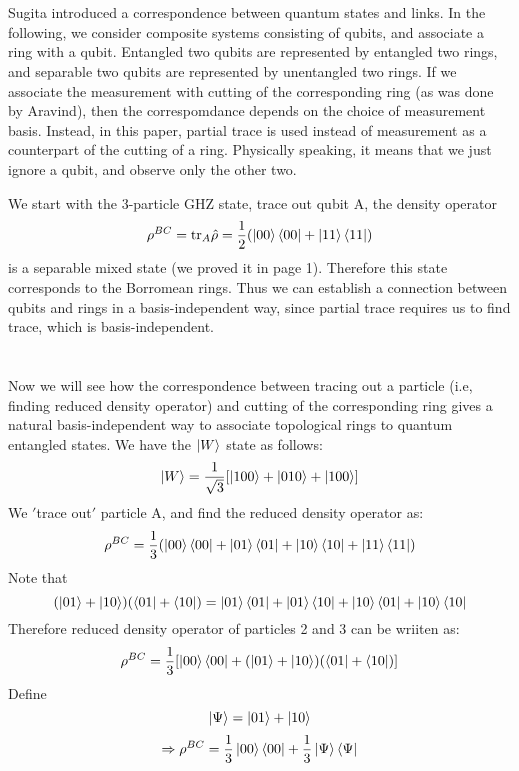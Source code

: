\documentclass{article}
\begin{document}
\section{}
Sugita introduced a correspondence between quantum states and links. In the
 following, we consider composite systems consisting of qubits, and associate a ring
 with a qubit. Entangled two qubits are represented by entangled two rings, and separable two qubits are represented by unentangled two rings.  If we associate the measurement with cutting of the corresponding ring (as was done by Aravind), then the correspomdance  depends on the choice of measurement basis. Instead, in this paper, partial trace is used instead of measurement as a counterpart of the cutting of a ring. Physically speaking, it means that we just ignore a qubit, and observe
 only the other two.

We start with the 3-particle GHZ state, trace out qubit A, the density operator 
\[
\rho^{BC} = \mathrm{tr}_A\hat{\rho} = \frac{1}{2}(\ket{00}\bra{00}+\ket{11}\bra{11})
\]
is a separable mixed state (we proved it in page 1). Therefore this state corresponds to the Borromean rings. Thus we can establish a connection between qubits and rings in a basis-independent way, since partial trace requires us to find trace, which is basis-independent.



\section{}
Now we will see how the correspondence between tracing out a particle (i.e, finding reduced density operator) and cutting of the corresponding ring gives a natural basis-independent way to associate topological rings to quantum entangled states. We have the $\ket{W}$ state as follows:
\[
\ket{W} = \frac{1}{\sqrt{3}}[\ket{100}+\ket{010}+\ket{100}]
\]
We $'$trace out$'$ particle A, and find the reduced density operator as:
\[
\rho^{BC} = \frac{1}{3}(\ket{00}\bra{00}+\ket{01}\bra{01}+\ket{10}\bra{10}+\ket{11}\bra{11})
\]
Note that
\[
(\ket{01}+\ket{10})(\bra{01}+\bra{10}) = \ket{01}\bra{01}+\ket{01}\bra{10}+\ket{10}\bra{01}+\ket{10}\bra{10}
\]
Therefore reduced density operator of particles 2 and 3 can be wriiten as:
\[
 \rho^{BC} = \frac{1}{3}[\ket{00}\bra{00}+(\ket{01}+\ket{10})(\bra{01}+\bra{10})]
\]
Define
\[
\ket{\Psi} = \ket{01}+\ket{10}
\]
\[
\Rightarrow \rho^{BC} = \frac{1}{3}\ket{00}\bra{00}+\frac{1}{3}\ket{\Psi}\bra{\Psi}
\]
\end{document}
